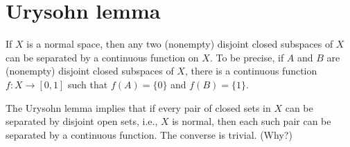\section{Urysohn lemma}
\begin{thm}\label{Urysohn lemma}
    If $X$ is a normal space, then any two (nonempty) disjoint closed subspaces of $X$ can be separated by a continuous function on $X$.
    To be precise, if $A$ and $B$ are (nonempty) disjoint closed subspaces of $X$, there is a continuous function $f: X\rightarrow[0, 1]$ such that $f(A)=\{0\}$ and $f(B)=\{1\}$.
\end{thm}
\begin{rmk}
    The Urysohn lemma implies that if every pair of closed sets in $X$ can be separated by disjoint open sets, i.e., $X$ is normal, then each such pair can be separated by a continuous function.
    The converse is trivial. (Why?)
\end{rmk}
